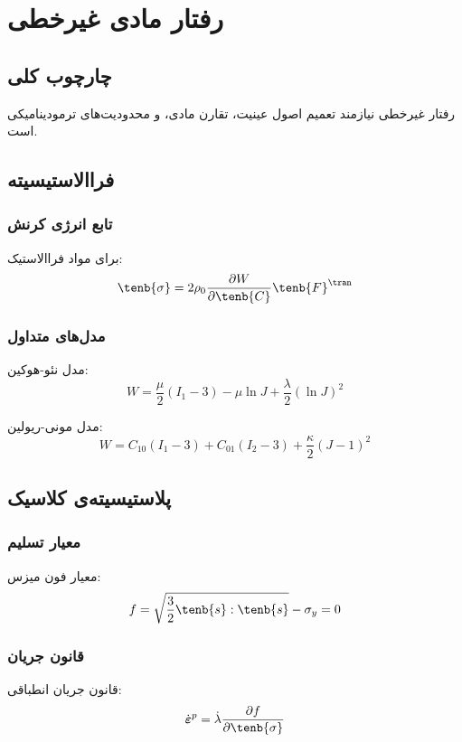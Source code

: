 \section{رفتار مادی غیرخطی}

\subsection{چارچوب کلی}

رفتار غیرخطی نیازمند تعمیم اصول عینیت، تقارن مادی، و محدودیت‌های ترمودینامیکی است.

\subsection{فراالاستیسیته}

\subsubsection{تابع انرژی کرنش}
برای مواد فراالاستیک:
\begin{equation}
	\tenb{\sigma} = 2\rho_0 \frac{\partial W}{\partial \tenb{C}} \tenb{F}^\tran
\end{equation}

\subsubsection{مدل‌های متداول}
مدل نئو-هوکین:
\begin{equation}
	W = \frac{\mu}{2}(I_1 - 3) - \mu \ln J + \frac{\lambda}{2}(\ln J)^2
\end{equation}

مدل مونی-ریولین:
\begin{equation}
	W = C_{10}(I_1 - 3) + C_{01}(I_2 - 3) + \frac{\kappa}{2}(J - 1)^2
\end{equation}

\subsection{پلاستیسیته‌ی کلاسیک}

\subsubsection{معیار تسلیم}
معیار فون میزس:
\begin{equation}
	f = \sqrt{\frac{3}{2} \tenb{s} : \tenb{s}} - \sigma_y = 0
\end{equation}

\subsubsection{قانون جریان}
قانون جریان انطباقی:
\begin{equation}
	\dot{\boldsymbol{\varepsilon}}^p = \dot{\lambda} \frac{\partial f}{\partial \tenb{\sigma}}
\end{equation}

